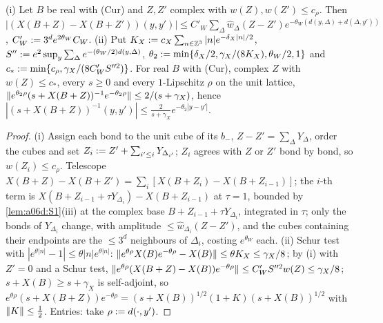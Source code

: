\begin{lemma}\label{lem:a06d:G0}
\textup{(i)} Let $B$ be real with (Cur) and $Z,Z'$ complex with $w(Z),w(Z')\le c_\rho$. Then $|(X(B+Z)-X(B+Z'))(y,y')|\le C'_W\sum_\Delta\hat w_\Delta(Z-Z')e^{-\theta_W(d(y,\Delta)+d(\Delta,y'))}$, $C'_W:=3^de^{2\theta_W}C_W$. \textup{(ii)} Put $K_X:= c_X\sum_{n\in\mathbb Z^3}|n|e^{-\delta_X|n|/2}$, $S'':= e^2\sup_y\sum_\Delta e^{-(\theta_W/2)d(y,\Delta)}$, $\theta_2:=\min\{\delta_X/2,\gamma_X/(8K_X),\theta_W/2,1\}$ and $c_*:=\min\{c_\rho,\gamma_X/(8C'_WS''^2)\}$. For real $B$ with (Cur), complex $Z$ with $w(Z)\le c_*$, every $s\ge0$ and every $1$-Lipschitz $\rho$ on the unit lattice, $\lVert e^{\theta_2\rho}(s+X(B+Z))^{-1}e^{-\theta_2\rho}\rVert\le2/(s+\gamma_X)$, hence $|(s+X(B+Z))^{-1}(y,y')|\le\frac2{s+\gamma_X}e^{-\theta_2|y-y'|}$.
\end{lemma}

\begin{proof}
(i) Assign each bond to the unit cube of its $b_-$, $Z-Z'=\sum_\Delta Y_\Delta$, order the cubes and set $Z_i:= Z'+\sum_{i'\le i}Y_{\Delta_{i'}}$; $Z_i$ agrees with $Z$ or $Z'$ bond by bond, so $w(Z_i)\le c_\rho$. Telescope $X(B+Z)-X(B+Z')=\sum_i[X(B+Z_i)-X(B+Z_{i-1})]$; the $i$-th term is $X(B+Z_{i-1}+\tau Y_{\Delta_i})-X(B+Z_{i-1})$ at $\tau=1$, bounded by \cref{lem:a06d:S1}(iii) at the complex base $B+Z_{i-1}+\tau Y_{\Delta_i}$, integrated in $\tau$; only the bonds of $Y_{\Delta_i}$ change, with amplitude $\le\hat w_{\Delta_i}(Z-Z')$, and the cubes containing their endpoints are the $\le3^d$ neighbours of $\Delta_i$, costing $e^{\theta_W}$ each. (ii) Schur test with $|e^{\theta|n|}-1|\le\theta|n|e^{\theta|n|}$: $\lVert e^{\theta\rho}X(B)e^{-\theta\rho}-X(B)\rVert\le\theta K_X\le\gamma_X/8$; by (i) with $Z'=0$ and a Schur test, $\lVert e^{\theta\rho}(X(B+Z)-X(B))e^{-\theta\rho}\rVert\le C'_WS''^2w(Z)\le\gamma_X/8$; $s+X(B)\ge s+\gamma_X$ is self-adjoint, so $e^{\theta\rho}(s+X(B+Z))e^{-\theta\rho}=(s+X(B))^{1/2}(1+K)(s+X(B))^{1/2}$ with $\lVert K\rVert\le\frac12$. Entries: take $\rho:= d(\cdot,y')$.
\end{proof}
